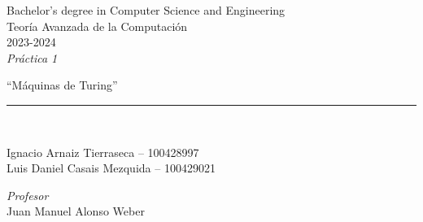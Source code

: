 \def\degree{Bachelor's degree in Computer Science and Engineering}
\def\subject{Teoría Avanzada de la Computación}
\def\year{2023-2024}
\def\labType{Práctica 1}
\def\labName{Máquinas de Turing}
\def\proffesor{Juan Manuel Alonso Weber}

\begin{titlepage}
	\begin{sffamily}
	\color{azulUC3M}
	\begin{center}

		\begin{figure}[H]
		\end{figure}
		\vspace{1.5cm}

		\begin{Large}
			\degree\\
            \subject\\
			\year\\
			\vspace{2cm}		
			\textsl{\labType}
			\bigskip
			
		\end{Large}

		{\Huge ``\labName''}\\

		\vspace*{0.5cm}
		\rule{10.5cm}{0.1mm}\\
		\vspace*{0.9cm}
		
 		{\LARGE Ignacio Arnaiz Tierraseca -- 100428997}\\
 		\vspace*{0.2cm}
 		{\LARGE Luis Daniel Casais Mezquida -- 100429021}\\
 		\vspace*{0.2cm}
		
		\vspace*{0.8cm}
		
		\begin{Large}
		    \textsl{Profesor}\\
			\proffesor\\
		\end{Large}

	\end{center}
	\vfill
	\end{sffamily}
\end{titlepage}
